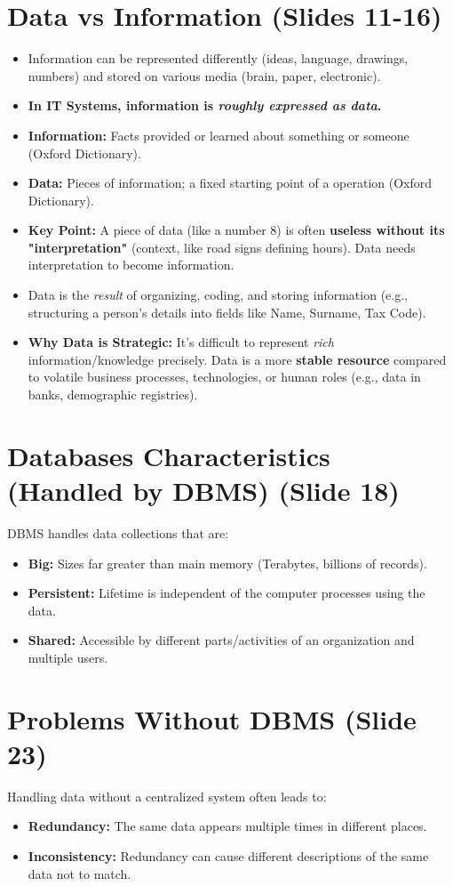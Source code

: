 \documentclass{article}
\begin{document}
	\section{Data vs Information (Slides 11-16)}
	\begin{itemize}
		\item Information can be represented differently (ideas, language, drawings, numbers) and stored on various media (brain, paper, electronic).
		\item \textbf{In IT Systems, information is \emph{roughly expressed as data}.}
		\item \textbf{Information:} Facts provided or learned about something or someone (Oxford Dictionary).
		\item \textbf{Data:} Pieces of information; a fixed starting point of a operation (Oxford Dictionary).
		\item \textbf{Key Point:} A piece of data (like a number 8) is often \textbf{useless without its "interpretation"} (context, like road signs defining hours). Data needs interpretation to become information.
		\item Data is the \emph{result} of organizing, coding, and storing information (e.g., structuring a person's details into fields like Name, Surname, Tax Code).
		\item \textbf{Why Data is Strategic:} It's difficult to represent \emph{rich} information/knowledge precisely. Data is a more \textbf{stable resource} compared to volatile business processes, technologies, or human roles (e.g., data in banks, demographic registries).
	\end{itemize}
	
	\section{Databases Characteristics (Handled by DBMS) (Slide 18)}
	DBMS handles data collections that are:
	\begin{itemize}
		\item \textbf{Big:} Sizes far greater than main memory (Terabytes, billions of records).
		\item \textbf{Persistent:} Lifetime is independent of the computer processes using the data.
		\item \textbf{Shared:} Accessible by different parts/activities of an organization and multiple users.
	\end{itemize}
	
	\section{Problems Without DBMS (Slide 23)}
	Handling data without a centralized system often leads to:
	\begin{itemize}
		\item \textbf{Redundancy:} The same data appears multiple times in different places.
		\item \textbf{Inconsistency:} Redundancy can cause different descriptions of the same data not to match.
	\end{itemize}
	
\end{document}
